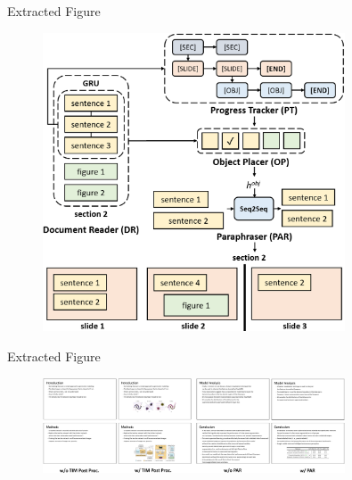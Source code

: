 \documentclass{beamer}
\begin{document}
\begin{frame}{Extracted Figure}
    \centering
    \begin{figure}
        \includegraphics[width=0.8\textwidth]{extracted_images/figure_3_1.png}  %
    \end{figure}
\end{frame}

\begin{frame}{Extracted Figure}
    \centering
    \begin{figure}
        \includegraphics[width=0.8\textwidth]{extracted_images/figure_7_1.png}  %
    \end{figure}
\end{frame}
\end{document}
